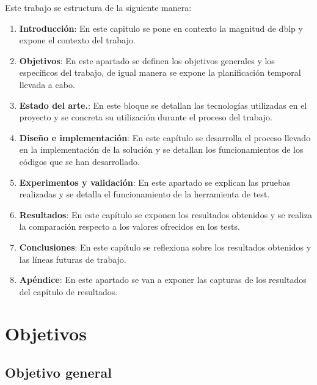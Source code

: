 \documentclass[a4paper, 12pt]{book}
\begin{document}
Este trabajo se estructura de la siguiente manera:
\begin{enumerate}
    \item \textbf{Introducción}: En este capitulo se pone en contexto la magnitud de dblp y expone el contexto del trabajo.
    \item\textbf{Objetivos}: En este apartado se definen los objetivos generales y los específicos del trabajo, de igual manera se expone la planificación temporal llevada a cabo.
    \item\textbf{Estado del arte.}: En este bloque se detallan las tecnologías utilizadas en el proyecto y se concreta su utilización durante el proceso del trabajo.
    \item\textbf{Diseño e implementación}: En este capítulo se desarrolla el proceso llevado en la implementación de la solución y se detallan los funcionamientos de los códigos que se han desarrollado.
    \item\textbf{Experimentos y validación}: En este apartado se explican las pruebas realizadas y se detalla el funcionamiento de la herramienta de test.
    \item\textbf{Resultados}: En este capítulo se exponen los resultados obtenidos y se realiza la comparación respecto a los valores ofrecidos en los tests.
    \item\textbf{Conclusiones}: En este capítulo se reflexiona sobre los resultados obtenidos y las líneas futuras de trabajo.
    \item\textbf{Apéndice}: En este apartado se van a exponer las capturas de los resultados del capítulo de resultados.
\end{enumerate}



\cleardoublepage %
\chapter{Objetivos} %
\label{chap:objetivos} %

\section{Objetivo general} %
\label{sec:objetivo-general} %
\end{document}

